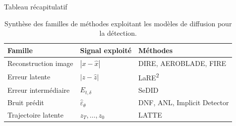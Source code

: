 \documentclass[10pt,aspectratio=169]{beamer}
\begin{document}
\begin{frame}{Tableau récapitulatif}

\begin{table}
\centering
\small
\begin{tabular}{lll}
\toprule
\textbf{Famille} & \textbf{Signal exploité} & \textbf{Méthodes} \\
\midrule
Reconstruction image & \( |x-\hat{x}| \) & DIRE, AEROBLADE, FIRE \\
Erreur latente & \( |z-\hat{z}| \) & LaRE\textsuperscript{2} \\
Erreur intermédiaire & \(E_{t,\delta}\) & SeDID \\
Bruit prédit & \(\hat{\varepsilon}_\theta\) & DNF, ANL, Implicit Detector \\
Trajectoire latente & \(z_T,\dots,z_0\) & LATTE \\
\bottomrule
\end{tabular}

\caption{Synthèse des familles de méthodes exploitant les modèles de diffusion pour la détection.}
\end{table}

\end{frame}
\end{document}
